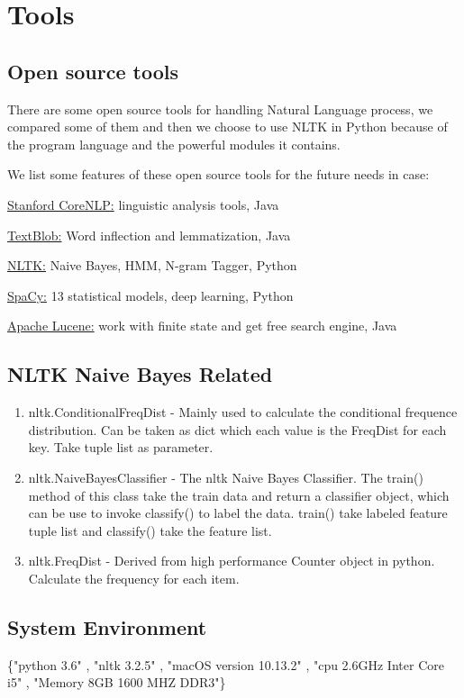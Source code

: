 \documentclass[a4paper]{article}
\begin{document}
\section{Tools}
\subsection{Open source tools}
There are some open source tools for handling Natural Language process, we compared some of them and then we choose to use NLTK in Python because of the program language and the powerful modules it contains. 

We list some features of these open source tools for the future needs in case:

\href{https://stanfordnlp.github.io/CoreNLP/}{Stanford CoreNLP:} linguistic analysis tools, Java

\href{http://textblob.readthedocs.io/en/dev/}{TextBlob:} Word inflection and lemmatization, Java

\href{https://www.nltk.org/}{NLTK:} Naive Bayes, HMM, N-gram Tagger, Python

\href{https://spacy.io/}{SpaCy:} 13 statistical models, deep learning, Python

\href{http://lucene.apache.org/}{Apache Lucene:} work with finite state and get free search engine, Java

\subsection{NLTK Naive Bayes Related}
\begin{enumerate}
\item nltk.ConditionalFreqDist - Mainly used to calculate the conditional frequence distribution. Can be taken as dict which each value is the FreqDist for each key. Take tuple list as parameter.
\item nltk.NaiveBayesClassifier - The nltk Naive Bayes Classifier. The train() method of this class take the train data and return a classifier object, which can be use to invoke classify() to label the data. train() take labeled feature tuple list and classify() take the feature list.
\item nltk.FreqDist - Derived from high performance Counter object in python. Calculate the frequency for each item.
\end{enumerate}
\subsection{System Environment}
\{"python 3.6"
, "nltk 3.2.5"
, "macOS version 10.13.2"
, "cpu 2.6GHz Inter Core i5"
, "Memory 8GB 1600 MHZ DDR3"\}
\end{document}
